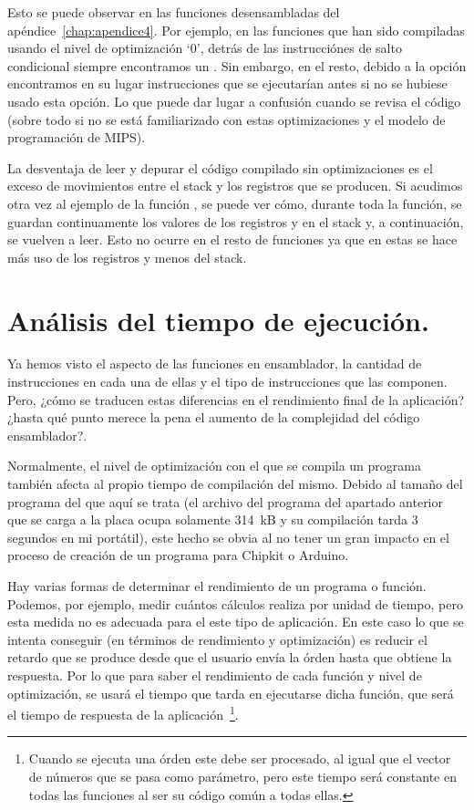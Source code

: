 Esto se puede observar en las funciones desensambladas del apéndice~\ref{chap:apendice4}. Por ejemplo, en las funciones que han sido compiladas usando el nivel de optimización `0', detrás de las instrucciónes de salto condicional siempre encontramos un . Sin embargo, en el resto, debido a la opción  encontramos en su lugar instrucciones que se ejecutarían antes si no se hubiese usado esta opción. Lo que puede dar lugar a confusión cuando se revisa el código (sobre todo si no se está familiarizado con estas optimizaciones y el modelo de programación de MIPS).

La desventaja de leer y depurar el código compilado sin optimizaciones es el exceso de movimientos entre el stack y los registros que se producen. Si acudimos otra vez al ejemplo de la función , se puede ver cómo, durante toda la función, se guardan continuamente los valores de los registros  y  en el stack y, a continuación, se vuelven a leer. Esto no ocurre en el resto de funciones ya que en estas se hace más uso de los registros y menos del stack.

\section{Análisis del tiempo de ejecución.} %
\label{sec:Análisis del tiempo de ejecución.}
Ya hemos visto el aspecto de las funciones en ensamblador, la cantidad de instrucciones en cada una de ellas y el tipo de instrucciones que las componen. Pero, ¿cómo se traducen estas diferencias en el rendimiento final de la aplicación? ¿hasta qué punto merece la pena el aumento de la complejidad del código ensamblador?.

Normalmente, el nivel de optimización con el que se compila un programa también afecta al propio tiempo de compilación del mismo. Debido al tamaño del programa del que aquí se trata (el archivo del programa del apartado anterior que se carga a la placa ocupa solamente 314~kB y su compilación tarda 3 segundos en mi portátil), este hecho se obvia al no tener un gran impacto en el proceso de creación de un programa para Chipkit o Arduino.

Hay varias formas de determinar el rendimiento de un programa o función. Podemos, por ejemplo, medir cuántos cálculos realiza por unidad de tiempo, pero esta medida no es adecuada para el este tipo de aplicación. En este caso lo que se intenta conseguir (en términos de rendimiento y optimización) es reducir el retardo que se produce desde que el usuario envía la órden hasta que obtiene la respuesta. Por lo que para saber el rendimiento de cada función y nivel de optimización, se usará el tiempo que tarda en ejecutarse dicha función, que será el tiempo de respuesta de la aplicación~\footnote{Cuando se ejecuta una órden este debe ser procesado, al igual que el vector de números que se pasa como parámetro, pero este tiempo será constante en todas las funciones al ser su código común a todas ellas.}.

